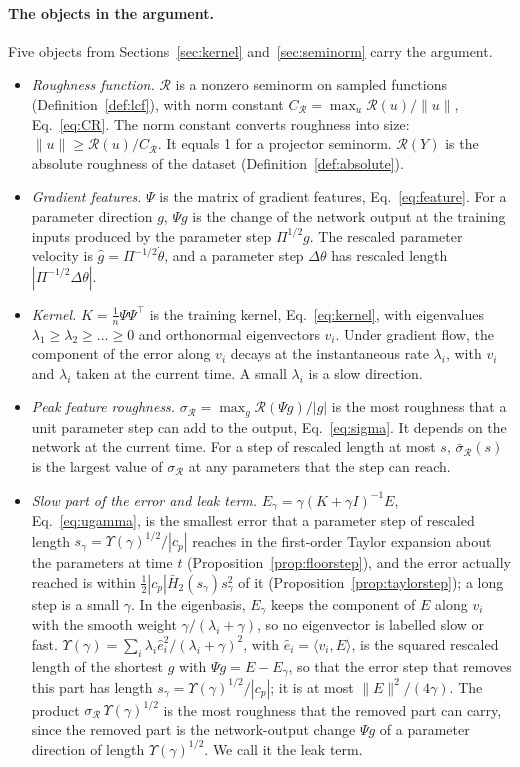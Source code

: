 \documentclass[11pt]{article}
\theoremstyle{definition}
\theoremstyle{remark}
\newcommand{\Rgh}{\mathcal{R}}           %
\newcommand{\sR}{\sigma_{\Rgh}}
\newcommand{\CR}{C_{\Rgh}}
\newcommand{\ip}[2]{\langle #1,#2\rangle}
\begin{document}
\paragraph{The objects in the argument.}
Five objects from Sections~\ref{sec:kernel} and~\ref{sec:seminorm} carry the argument.
\begin{itemize}
\item \emph{Roughness function.} $\Rgh$ is a nonzero seminorm on sampled functions (Definition~\ref{def:lcf}), with norm constant $\CR = \max_u\Rgh(u)/\|u\|$, Eq.~\eqref{eq:CR}.
The norm constant converts roughness into size: $\|u\| \ge \Rgh(u)/\CR$.
It equals 1 for a projector seminorm.
$\Rgh(Y)$ is the absolute roughness of the dataset (Definition~\ref{def:absolute}).
\item \emph{Gradient features.} $\Psi$ is the matrix of gradient features, Eq.~\eqref{eq:feature}.
For a parameter direction $g$, $\Psi g$ is the change of the network output at the training inputs produced by the parameter step $\Pi^{1/2}g$.
The rescaled parameter velocity is $\hat g = \Pi^{-1/2}\dot\theta$, and a parameter step $\Delta\theta$ has rescaled length $|\Pi^{-1/2}\Delta\theta|$.
\item \emph{Kernel.} $K = \tfrac1n\Psi\Psi^\top$ is the training kernel, Eq.~\eqref{eq:kernel}, with eigenvalues $\lambda_1 \ge \lambda_2 \ge \dots \ge 0$ and orthonormal eigenvectors $v_i$.
Under gradient flow, the component of the error along $v_i$ decays at the instantaneous rate $\lambda_i$, with $v_i$ and $\lambda_i$ taken at the current time.
A small $\lambda_i$ is a slow direction.
\item \emph{Peak feature roughness.} $\sR = \max_g\Rgh(\Psi g)/|g|$ is the most roughness that a unit parameter step can add to the output, Eq.~\eqref{eq:sigma}.
It depends on the network at the current time.
For a step of rescaled length at most $s$, $\bar\sigma_\Rgh(s)$ is the largest value of $\sR$ at any parameters that the step can reach.
\item \emph{Slow part of the error and leak term.} $E_\gamma = \gamma(K+\gamma I)^{-1}E$, Eq.~\eqref{eq:ugamma}, is the smallest error that a parameter step of rescaled length $s_\gamma = \Upsilon(\gamma)^{1/2}/|c_p|$ reaches in the first-order Taylor expansion about the parameters at time $t$ (Proposition~\ref{prop:floorstep}), and the error actually reached is within $\tfrac12|c_p|\bar H_2(s_\gamma)s_\gamma^2$ of it (Proposition~\ref{prop:taylorstep}); a long step is a small $\gamma$.
In the eigenbasis, $E_\gamma$ keeps the component of $E$ along $v_i$ with the smooth weight $\gamma/(\lambda_i+\gamma)$, so no eigenvector is labelled slow or fast.
$\Upsilon(\gamma) = \sum_i\lambda_i\hat e_i^2/(\lambda_i+\gamma)^2$, with $\hat e_i = \ip{v_i}{E}$, is the squared rescaled length of the shortest $g$ with $\Psi g = E - E_\gamma$, so that the error step that removes this part has length $s_\gamma = \Upsilon(\gamma)^{1/2}/|c_p|$; it is at most $\|E\|^2/(4\gamma)$.
The product $\sR\,\Upsilon(\gamma)^{1/2}$ is the most roughness that the removed part can carry, since the removed part is the network-output change $\Psi g$ of a parameter direction of length $\Upsilon(\gamma)^{1/2}$.
We call it the leak term.
\end{itemize}
\end{document}
